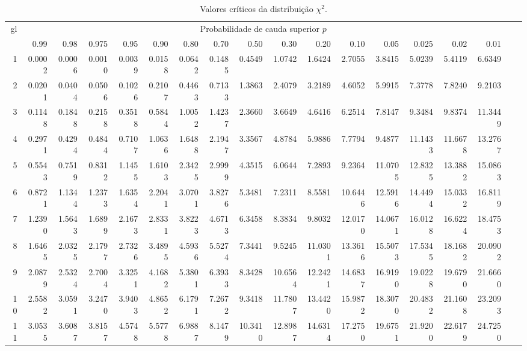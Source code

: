 \begin{table}[ht]
\vspace*{-1.75in}\small
\centering
\caption{Valores críticos da distribuição $\chi^2$.}
\begin{sideways}
\begin{tabular}{r||rrrrrrrrrrrrrrrrr}
\hline
 \multirow{2}{*}{gl} & \multicolumn{15}{|c}{Probabilidade de cauda superior $p$} \\
  \cline{2-16}
 & 0.99 & 0.98 & 0.975 & 0.95 & 0.90 & 0.80 & 0.70 & 0.50 & 0.30 & 0.20 & 0.10 & 0.05 & 0.025 & 0.02 & 0.01 \\ 
  \hline
1 & 0.0002 & 0.0006 & 0.0010 & 0.0039 & 0.0158 & 0.0642 & 0.1485 & 0.4549 & 1.0742 & 1.6424 & 2.7055 & 3.8415 & 5.0239 & 5.4119 & 6.6349 \\ 
  2 & 0.0201 & 0.0404 & 0.0506 & 0.1026 & 0.2107 & 0.4463 & 0.7133 & 1.3863 & 2.4079 & 3.2189 & 4.6052 & 5.9915 & 7.3778 & 7.8240 & 9.2103 \\ 
  3 & 0.1148 & 0.1848 & 0.2158 & 0.3518 & 0.5844 & 1.0052 & 1.4237 & 2.3660 & 3.6649 & 4.6416 & 6.2514 & 7.8147 & 9.3484 & 9.8374 & 11.3449 \\ 
  4 & 0.2971 & 0.4294 & 0.4844 & 0.7107 & 1.0636 & 1.6488 & 2.1947 & 3.3567 & 4.8784 & 5.9886 & 7.7794 & 9.4877 & 11.1433 & 11.6678 & 13.2767 \\ 
  5 & 0.5543 & 0.7519 & 0.8312 & 1.1455 & 1.6103 & 2.3425 & 2.9999 & 4.3515 & 6.0644 & 7.2893 & 9.2364 & 11.0705 & 12.8325 & 13.3882 & 15.0863 \\ 
  6 & 0.8721 & 1.1344 & 1.2373 & 1.6354 & 2.2041 & 3.0701 & 3.8276 & 5.3481 & 7.2311 & 8.5581 & 10.6446 & 12.5916 & 14.4494 & 15.0332 & 16.8119 \\ 
  7 & 1.2390 & 1.5643 & 1.6899 & 2.1673 & 2.8331 & 3.8223 & 4.6713 & 6.3458 & 8.3834 & 9.8032 & 12.0170 & 14.0671 & 16.0128 & 16.6224 & 18.4753 \\ 
  8 & 1.6465 & 2.0325 & 2.1797 & 2.7326 & 3.4895 & 4.5936 & 5.5274 & 7.3441 & 9.5245 & 11.0301 & 13.3616 & 15.5073 & 17.5345 & 18.1682 & 20.0902 \\ 
  9 & 2.0879 & 2.5324 & 2.7004 & 3.3251 & 4.1682 & 5.3801 & 6.3933 & 8.3428 & 10.6564 & 12.2421 & 14.6837 & 16.9190 & 19.0228 & 19.6790 & 21.6660 \\ 
  10 & 2.5582 & 3.0591 & 3.2470 & 3.9403 & 4.8652 & 6.1791 & 7.2672 & 9.3418 & 11.7807 & 13.4420 & 15.9872 & 18.3070 & 20.4832 & 21.1608 & 23.2093 \\ 
  11 & 3.0535 & 3.6087 & 3.8157 & 4.5748 & 5.5778 & 6.9887 & 8.1479 & 10.3410 & 12.8987 & 14.6314 & 17.2750 & 19.6751 & 21.9200 & 22.6179 & 24.7250 \\ 

\end{tabular}
\end{sideways}
\end{table}
